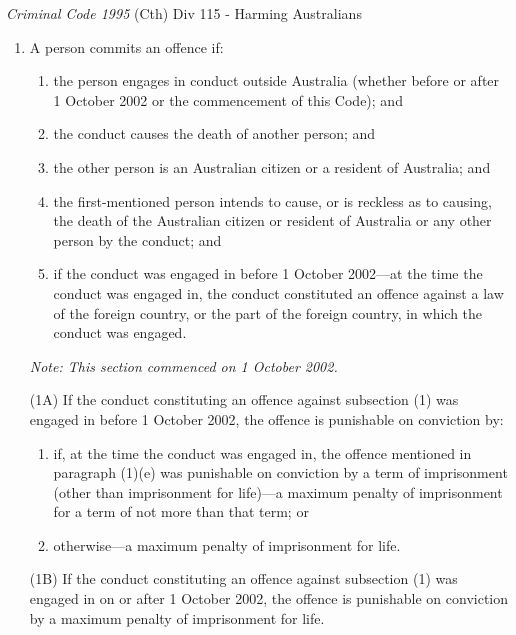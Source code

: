 \begin{statutedetails}{\textit{Criminal Code 1995} (Cth) Div 115 - Harming Australians}
    \flushleft
    \begin{enumerate}[label=(\arabic*)]
        \item A person commits an offence if:
        \begin{enumerate}[label=(\alph*)]
            \item the person engages in conduct outside Australia (whether before or after 1 October 2002 or the commencement of this Code); and
            \item the conduct causes the death of another person; and
            \item the other person is an Australian citizen or a resident of Australia; and
            \item the first-mentioned person intends to cause, or is reckless as to causing, the death of the Australian citizen or resident of Australia or any other person by the conduct; and
            \item if the conduct was engaged in before 1 October 2002—at the time the conduct was engaged in, the conduct constituted an offence against a law of the foreign country, or the part of the foreign country, in which the conduct was engaged.
        \end{enumerate}
        \par \textit{Note: This section commenced on 1 October 2002.}
        \item[(1A)] If the conduct constituting an offence against subsection (1) was engaged in before 1 October 2002, the offence is punishable on conviction by:
        \begin{enumerate}[label=(\alph*)]
            \item if, at the time the conduct was engaged in, the offence mentioned in paragraph (1)(e) was punishable on conviction by a term of imprisonment (other than imprisonment for life)—a maximum penalty of imprisonment for a term of not more than that term; or
            \item otherwise—a maximum penalty of imprisonment for life.
        \end{enumerate}
        \item[(1B)] If the conduct constituting an offence against subsection (1) was engaged in on or after 1 October 2002, the offence is punishable on conviction by a maximum penalty of imprisonment for life.

\end{enumerate}
\end{statutedetails}
